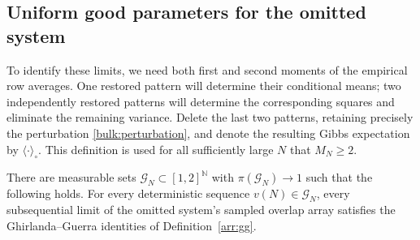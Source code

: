 \subsection{Uniform good parameters for the omitted system}

To identify these limits, we need both first and second moments of the
empirical row averages.  One restored pattern will determine their
conditional means; two independently restored patterns will determine
the corresponding squares and eliminate the remaining variance.
Delete the last two patterns, retaining precisely the perturbation
\eqref{bulk:perturbation}, and denote the resulting Gibbs expectation by
$\langle\cdot\rangle_\circ$.  This definition is used for all sufficiently
large $N$ that $M_N\ge2$.

\begin{lemma}
\label{bulk:good-parameters}
There are measurable sets $\mathcal G_N\subset[1,2]^{\mathbb N}$ with
$\pi(\mathcal G_N)\to1$ such that the following holds.  For every
deterministic sequence $v(N)\in\mathcal G_N$, every subsequential limit
of the omitted system's sampled overlap array satisfies the
Ghirlanda--Guerra identities of Definition~\ref{arr:gg}.
\end{lemma}

